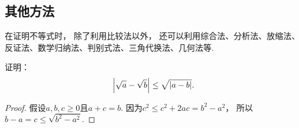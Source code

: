 \subsection{其他方法}
在证明不等式时，
除了利用比较法以外，
还可以利用综合法、分析法、放缩法、反证法、数学归纳法、判别式法、三角代换法、几何法等.

\begin{example}
证明：\begin{equation}\label{equation:不等式.根式差的绝对值的不等式}
	\abs{\sqrt{a}-\sqrt{b}} \leq \sqrt{\abs{a-b}}.
\end{equation}
\begin{proof}
假设\(a,b,c\geq0\)且\(a+c=b\).
因为\(c^2 \leq c^2+2ac = b^2-a^2\)，
所以\(b-a = c \leq \sqrt{b^2-a^2}\).
\end{proof}
\end{example}
